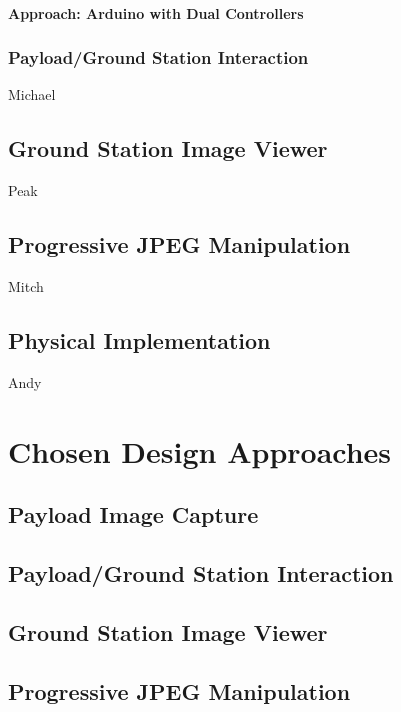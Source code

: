 \documentclass[oneside]{ecsgdp}         %
\begin{document}
\subsubsection{Approach: Arduino with Dual Controllers}



\subsection{Payload/Ground Station Interaction}
Michael


\section{Ground Station Image Viewer}
Peak

\section{Progressive JPEG Manipulation}
Mitch

\section{Physical Implementation}
Andy


\chapter{Chosen Design Approaches}


\section{Payload Image Capture}

\section{Payload/Ground Station Interaction}

\section{Ground Station Image Viewer}

\section{Progressive JPEG Manipulation}
\end{document}
